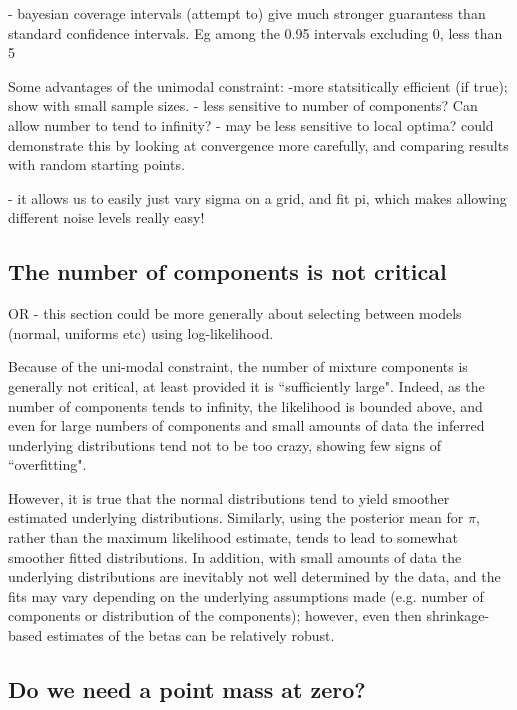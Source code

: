 \documentclass[10pt]{article}
\begin{document}
- bayesian coverage intervals (attempt to) give much stronger guarantess than standard confidence intervals. Eg among the 0.95 intervals excluding 0,
less than 5%

Some advantages of the unimodal constraint:
-more statsitically efficient (if true); show with small sample sizes.
- less sensitive to number of components? Can allow number to tend to infinity?
- may be less sensitive to local optima?
could demonstrate this by looking at convergence more carefully, and comparing
results with random starting points.

- it allows us to easily just vary sigma on a grid, and fit pi, which
makes allowing different noise levels really easy!




\subsection{The number of components is not critical}
OR - this section could be more generally about selecting between
models (normal, uniforms etc) using log-likelihood.

Because of the uni-modal constraint, the number of mixture components
is generally not critical, at least provided it is ``sufficiently large". 
Indeed, as the number of components tends to infinity, the likelihood
is bounded above, and even for large numbers of components and small amounts of data the inferred underlying distributions tend not to be too crazy, showing few signs of ``overfitting". 

However, it is true that the normal distributions tend to yield smoother estimated underlying distributions. Similarly, using the posterior mean for $\pi$, rather
than the maximum likelihood estimate, tends to lead to somewhat smoother fitted distributions. In addition, with small amounts of data the underlying
distributions are inevitably not well determined by the data, and the fits may vary depending on the underlying assumptions made (e.g. number of components or distribution of the components); however, even then shrinkage-based estimates
of the betas can be relatively robust.

\subsection{Do we need a point mass at zero?}
\end{document}
